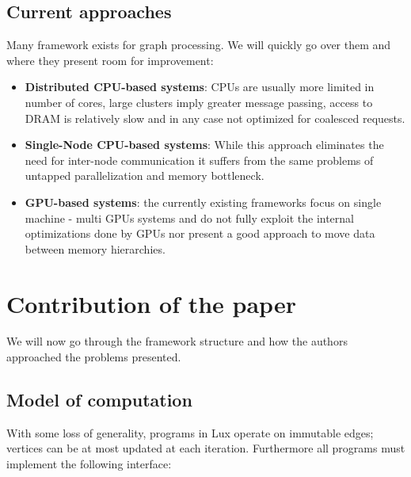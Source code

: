 \documentclass[]{article}
\begin{document}
\subsection{Current approaches}
Many framework exists for graph processing. We will quickly go over them and where they present room for improvement:
\begin{itemize}
	\item \textbf{Distributed CPU-based systems}: CPUs are usually more limited in number of cores, large clusters imply greater message passing, access to DRAM is relatively slow and in any case not optimized for coalesced requests.
	\item \textbf{Single-Node CPU-based systems}: While this approach eliminates the need for inter-node communication it suffers from the same problems of untapped parallelization and memory bottleneck.
	\item \textbf{GPU-based systems}: the currently existing frameworks focus on single machine - multi GPUs systems and do not fully exploit the internal optimizations done by GPUs nor present a good approach to move data between memory hierarchies.
\end{itemize}
 
 \section{Contribution of the paper}
 We will now go through the framework structure and how the authors approached the problems presented.
 \subsection{Model of computation}
 
With some loss of generality, programs in Lux operate on immutable edges; vertices can be at most updated at each iteration. Furthermore all programs must implement the following interface:
 
\end{document}

